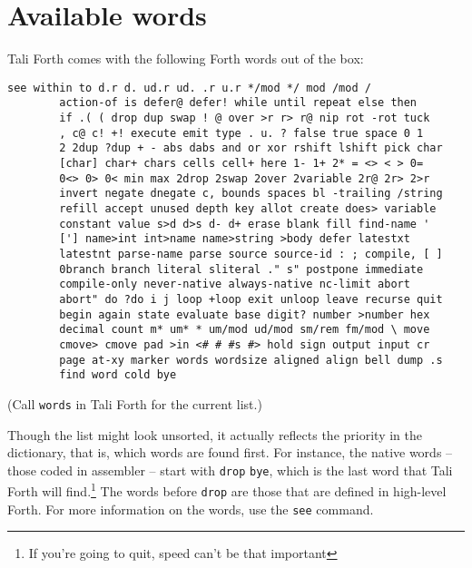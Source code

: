 \section{Available words}

Tali Forth comes with the following Forth words out of the
box:

\begin{lstlisting}[frame=lines]
        see within to d.r d. ud.r ud. .r u.r */mod */ mod /mod /
        action-of is defer@ defer! while until repeat else then
        if .( ( drop dup swap ! @ over >r r> r@ nip rot -rot tuck
        , c@ c! +! execute emit type . u. ? false true space 0 1
        2 2dup ?dup + - abs dabs and or xor rshift lshift pick char
        [char] char+ chars cells cell+ here 1- 1+ 2* = <> < > 0=
        0<> 0> 0< min max 2drop 2swap 2over 2variable 2r@ 2r> 2>r
        invert negate dnegate c, bounds spaces bl -trailing /string
        refill accept unused depth key allot create does> variable
        constant value s>d d>s d- d+ erase blank fill find-name '
        ['] name>int int>name name>string >body defer latestxt
        latestnt parse-name parse source source-id : ; compile, [ ]
        0branch branch literal sliteral ." s" postpone immediate
        compile-only never-native always-native nc-limit abort
        abort" do ?do i j loop +loop exit unloop leave recurse quit
        begin again state evaluate base digit? number >number hex
        decimal count m* um* * um/mod ud/mod sm/rem fm/mod \ move
        cmove> cmove pad >in <# # #s #> hold sign output input cr
        page at-xy marker words wordsize aligned align bell dump .s
        find word cold bye
\end{lstlisting}

\noindent (Call \texttt{words} in Tali Forth for the
current list.)

Though the list might look unsorted, it actually reflects the priority in the
dictionary, that is, which words are found first. For
instance, the native words -- those coded in assembler --
start with \texttt{drop}
\texttt{bye}, which is the last word that Tali Forth
will find.\footnote{If you're going to quit, speed can't be that important} The
words before \texttt{drop} are those that are defined in high-level Forth. For
more information on the words, use the \texttt{see}
command.

